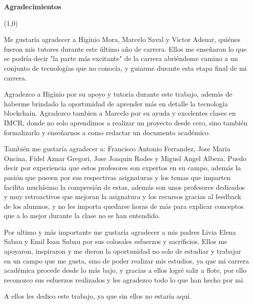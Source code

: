 \thispagestyle{empty}
{\Huge{ \textbf{ Agradecimientos }}}

\begin{center}
\line(1,0){\textwidth}
\end{center}

Me gustaría agradecer a Higinio Mora, Marcelo Saval y Victor Adsuar, quiénes fueron mis tutores durante este último año de carrera. Ellos me enseñaron lo que se podría decir "la parte más excitante" de la carrera abriéndome camino a un conjunto de tecnologías que no conocía, y guiarme durante esta etapa final de mi carrera. 

\bigskip

Agradezco a Higinio por su apoyo y tutoría durante este trabajo, además de haberme brindado la oportunidad de aprender más en detalle la tecnología blockchain. Agradezco tambien a Marcelo por su ayuda y excelentes clases en IMCR, donde no solo aprendimos a realizar un proyecto desde cero, sino también formalizarlo y enseñarnos a como redactar un documento académico.

\bigskip

También me gustaría agradecer a: Francisco Antonio Ferrandez, Jose Maria Oncina, Fidel Aznar Gregori, Jose Joaquin Rodes y Miguel Angel Albeza. Puedo decir por experiencia que estos profesores son expertos en su campo, además la pasión que poseen por sus respectivas asignaturas y los temas que imparten facilita muchísimo la compresión de estas, además son unos profesores dedicados y muy retroactivos que mejoran la asignatura y los recursos gracias al feedback de los alumnos, y no les importa quedarse horas de más para explicar conceptos que a lo mejor durante la clase no se han entendido.

\bigskip

Por ultimo y más importante me gustaría agradecer a mis padres Livia Elena Sabau y Emil Ioan Sabau por sus colosales esfuerzos y sacrificios. Ellos me apoyaron, inspiraron y me dieron la oportunidad no solo de estudiar y trabajar en un campo que me gusta, sino de poder realizar mis estudios, ya que mi carrera académica procede desde lo más bajo, y gracias a ellos logré salir a flote, por ello reconozco sus esfuerzos realizados y les agradezco todo lo que han hecho por mi.

\bigskip

A ellos les dedico este trabajo, ya que sin ellos no estaría aquí.


